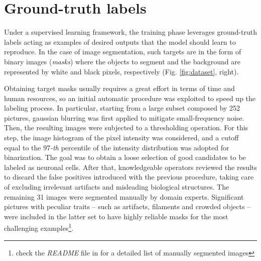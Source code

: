 \section{Ground-truth labels}
Under a supervised learning framework, the training phase leverages ground-truth labels acting as examples of desired outputs that the model should learn to reproduce. 
In the case of image segmentation, such targets are in the form of binary images (\textit{masks}) where the objects to segment and the background are represented by white and black pixels, respectively (Fig. \ref{fig:dataset}, right).

Obtaining target masks usually requires a great effort in terms of time and human resources, so an initial automatic procedure was exploited to speed up the labeling process. 
In particular, starting from a large subset composed by 252 pictures, gaussian blurring was first applied to mitigate small-frequency noise. 
Then, the resulting images were subjected to a thresholding operation.
For this step, the image histogram of the pixel intensity was considered, and a cutoff equal to the 97\emph{-th} percentile of the intensity distribution was adopted for binarization. 
The goal was to obtain a loose selection of good candidates to be labeled as neuronal cells. 
After that, knowledgeable operators reviewed the results to discard the false positives introduced with the previous procedure, taking care of excluding irrelevant artifacts and misleading biological structures.
The remaining 31 images were segmented manually by domain experts. Significant pictures with peculiar traits -- such as artifacts, filaments and crowded objects -- were included in the latter set to have highly reliable masks for the most challenging examples\footnote{check the \emph{README} file in  for a detailed list of manually segmented images}. 



